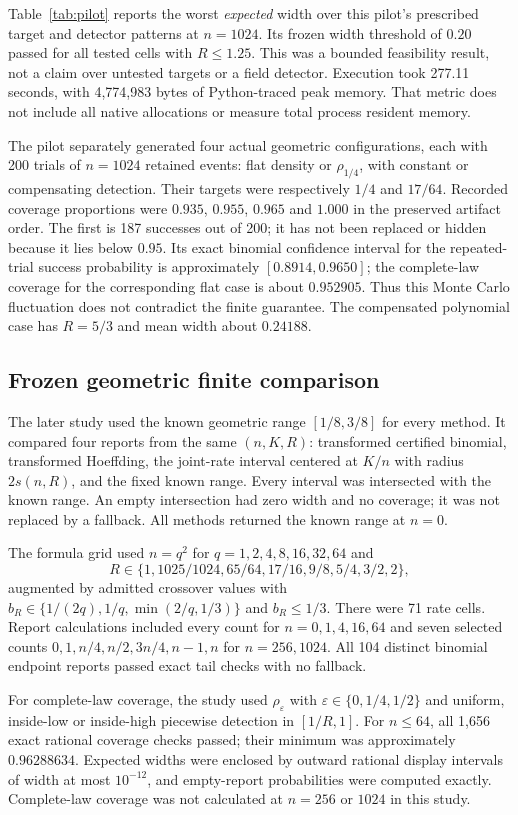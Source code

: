 \documentclass[11pt]{article}
\theoremstyle{remark}
\begin{document}

Table~\ref{tab:pilot} reports the worst \emph{expected} width over this
pilot's prescribed target and detector patterns at $n=1024$. Its frozen
width threshold of $0.20$ passed for all tested cells with $R\le1.25$.
This was a bounded feasibility result, not a claim over untested targets
or a field detector. Execution took 277.11 seconds, with 4,774,983 bytes
of Python-traced peak memory. That metric does not include all native
allocations or measure total process resident memory.

The pilot separately generated four actual geometric configurations, each
with 200 trials of $n=1024$ retained events: flat density or
$\rho_{1/4}$, with constant or compensating detection. Their targets
were respectively $1/4$ and $17/64$. Recorded coverage proportions were
$0.935$, $0.955$, $0.965$ and $1.000$ in the preserved artifact order.
The first is 187 successes out of 200; it has not been replaced or hidden
because it lies below $0.95$. Its exact binomial confidence interval for
the repeated-trial success probability is approximately $[0.8914,0.9650]$;
the complete-law coverage for the corresponding flat case is about
$0.952905$. Thus this Monte Carlo fluctuation does not contradict the
finite guarantee. The compensated polynomial case has $R=5/3$ and mean
width about $0.24188$.

\subsection{Frozen geometric finite comparison}
The later study used the known geometric range $[1/8,3/8]$ for every
method. It compared four reports from the same $(n,K,R)$: transformed
certified binomial, transformed Hoeffding, the joint-rate interval centered
at $K/n$ with radius $2s(n,R)$, and the fixed known range. Every interval
was intersected with the known range. An empty intersection had zero width
and no coverage; it was not replaced by a fallback. All methods returned
the known range at $n=0$.

The formula grid used $n=q^2$ for $q=1,2,4,8,16,32,64$ and
\[
 R\in\{1,1025/1024,65/64,17/16,9/8,5/4,3/2,2\},
\]
augmented by admitted crossover values with
$b_R\in\{1/(2q),1/q,\min(2/q,1/3)\}$ and $b_R\le1/3$.
There were 71 rate cells. Report calculations included every count for
$n=0,1,4,16,64$ and seven selected counts
$0,1,n/4,n/2,3n/4,n-1,n$ for $n=256,1024$.
All 104 distinct binomial endpoint reports passed exact tail checks with
no fallback.

For complete-law coverage, the study used
$\rho_\varepsilon$ with $\varepsilon\in\{0,1/4,1/2\}$ and uniform,
inside-low or inside-high piecewise detection in $[1/R,1]$.
For $n\le64$, all 1,656 exact rational coverage checks passed; their
minimum was approximately $0.96288634$. Expected widths were enclosed
by outward rational display intervals of width at most $10^{-12}$,
and empty-report probabilities were computed exactly. Complete-law
coverage was not calculated at $n=256$ or $1024$ in this study.
\end{document}
